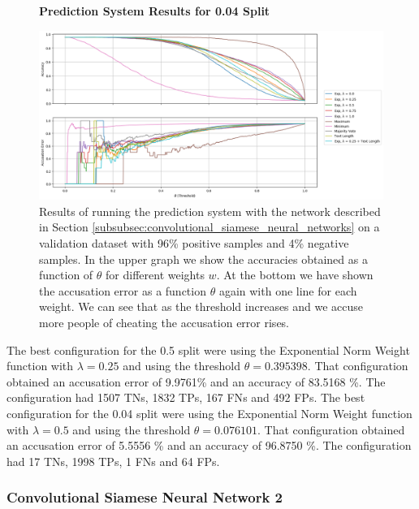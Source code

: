 \begin{figure}
    \centering
    \textbf{Prediction System Results for 0.04 Split}\par\medskip
    \includegraphics[width=\textwidth]{./pictures/experiments/Prediction_Network6_04.png}
    \caption{Results of running the prediction system with the network described
        in Section \ref{subsubsec:convolutional_siamese_neural_networks} on a
        validation dataset with 96\% positive samples and 4\% negative samples.
        In the upper graph we show the accuracies obtained as a function of
        $\theta$ for different weights $w$. At the bottom we have shown the
        accusation error as a function $\theta$ again with one line for each
        weight. We can see that as the threshold increases and we accuse more
        people of cheating the accusation error rises.}
    \label{fig:prediction_system_results_2}
\end{figure}

The best configuration for the 0.5 split were using the Exponential Norm Weight
function with $\lambda = 0.25$ and using the threshold $\theta = 0.395398$.
That configuration obtained an accusation error of 9.9761\% and an accuracy of
83.5168 \%. The configuration had 1507 \gls{TN}s, 1832 \gls{TP}s, 167 \gls{FN}s
and 492 \gls{FP}s. The best configuration for the 0.04 split were using the
Exponential Norm Weight function with $\lambda = 0.5$ and using the threshold
$\theta = 0.076101$. That configuration obtained an accusation error of 5.5556
\% and an accuracy of 96.8750 \%. The configuration had 17 \gls{TN}s, 1998
\gls{TP}s, 1 \gls{FN}s and 64 \gls{FP}s.


\subsubsection{Convolutional Siamese Neural Network 2}

